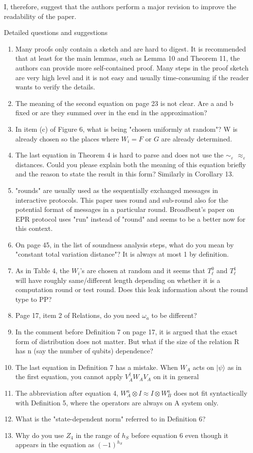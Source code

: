 \documentclass[12pt]{article}
\newcommand{\eps}{\varepsilon}
\newcommand{\ket}[1]{|#1\rangle}
\begin{document}
I, therefore, suggest that the authors perform a major revision to improve the readability of the paper.


Detailed questions and suggestions

\begin{enumerate}
\item Many proofs only contain a sketch and are hard to digest. It is recommended that at least for the main lemmas, such as Lemma 10 and Theorem 11, the authors can provide more self-contained proof. Many steps in the proof sketch are very high level and it is not easy and usually time-consuming if the reader wants to verify the details.
\item The meaning of the second equation on page 23 is not clear. Are a and b fixed or are they summed over in the end in the approximation?
\item In item (c) of Figure 6, what is being "chosen uniformly at random"? W is already chosen so the places where $W_i = F$ or $G$ are already determined.
\item The last equation in Theorem 4 is hard to parse and does not use the $\sim_\eps$ $\approx_\eps$ distances. Could you please explain both the meaning of this equation briefly and the reason to state the result in this form? Similarly in Corollary 13.
\item "rounds" are usually used as the sequentially exchanged messages in interactive protocols. This paper uses round and sub-round also for the potential format of messages in a particular round. Broadbent's paper on EPR protocol uses "run" instead of "round" and seems to be a better now for this context.
\item On page 45, in the list of soundness analysis steps, what do you mean by "constant total variation distance"? It is always at most 1 by definition.
\item As in Table 4, the $W_i$'s are chosen at random and it seems that $T^0_\ell$ and $T^1_\ell$ will have roughly same/different length depending on whether it is a computation round or test round. Does this leak information about the round type to PP?
\item Page 17, item 2 of Relations, do you need $\omega_a$ to be different?
\item In the comment before Definition 7 on page 17, it is argued that the exact form of distribution does not matter. But what if the size of the relation R has n (say the number of qubits) dependence?
\item The last equation in Definition 7 has a mistake. When $W_A$ acts on $\ket{\psi}$ as in the first equation, you cannot apply $V^\dagger_A W_A V_A$ on it in general
\item The abbreviation after equation 4, $W^a_A \otimes I \approx I \otimes W^a_B$ does not fit syntactically with Definition 5, where the operators are always on A system only.
\item What is the "state-dependent norm" referred to in Definition 6?
\item Why do you use $Z_4$ in the range of $h_S$ before equation 6 even though it appears in the equation as $(-1)^{h_S}$
\end{enumerate}
\end{document}
